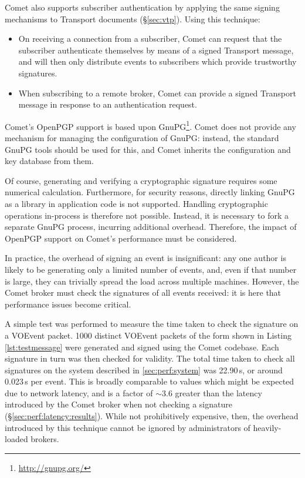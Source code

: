\documentclass[5p,authoryear]{elsarticle}
\begin{document}
Comet also supports subscriber authentication by applying the same signing
mechanisms to Transport documents (\S\ref{sec:vtp}). Using this technique:

\begin{itemize}

  \item{On receiving a connection from a subscriber, Comet can request that
  the subscriber authenticate themselves by means of a signed Transport
  message, and will then only distribute events to subscribers which provide
  trustworthy signatures.}

  \item{When subscribing to a remote broker, Comet can provide a signed
  Transport message in response to an authentication request.}

\end{itemize}


Comet's OpenPGP support is based upon GnuPG\footnote{\url{http://gnupg.org/}}.
Comet does not provide any mechanism for managing the configuration of GnuPG:
instead, the standard GnuPG tools should be used for this, and Comet inherits
the configuration and key database from them.

Of course, generating and verifying a cryptographic signature requires some
numerical calculation. Furthermore, for security reasons, directly linking
GnuPG as a library in application code is not supported. Handling
cryptographic operations in-process is therefore not possible. Instead, it is
necessary to fork a separate GnuPG process, incurring additional overhead.
Therefore, the impact of OpenPGP support on Comet's performance must be
considered.

In practice, the overhead of signing an event is insignificant: any one author
is likely to be generating only a limited number of events, and, even if that
number is large, they can trivially spread the load across multiple machines.
However, the Comet broker must check the signatures of all events received: it
is here that performance issues become critical.

A simple test was performed to measure the time taken to check the signature
on a VOEvent packet. 1000 distinct VOEvent packets of the form shown in
Listing \ref{lst:testmessage} were generated and signed using the Comet
codebase. Each signature in turn was then checked for validity. The total
time taken to check all signatures on the system described in
\ref{sec:perf:system} was 22.90\,s, or around 0.023\,s per event. This is
broadly comparable to values which might be expected due to network latency,
and is a factor of $\sim3.6$ greater than the latency introduced by the Comet
broker when not checking a signature (\S\ref{sec:perf:latency:results}). While
not prohibitively expensive, then, the overhead introduced by this technique
cannot be ignored by administrators of heavily-loaded brokers.
\end{document}
